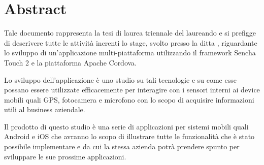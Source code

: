 \begingroup
\let\clearpage\relax
\let\cleardoublepage\relax
\let\cleardoublepage\relax

\chapter*{Abstract}
Tale documento rappresenta la tesi di laurea triennale del laureando \myName e si prefigge di descrivere tutte le attività inerenti lo stage, svolto presso la ditta \myCompany , riguardante lo sviluppo di un'applicazione multi-piattaforma utilizzando il framework Sencha Touch 2 e la piattaforma Apache Cordova.

Lo sviluppo dell'applicazione è uno studio su tali tecnologie e su come esse possano essere utilizzate efficacemente per interagire con i sensori interni ai device mobili quali GPS, fotocamera e microfono con lo scopo di acquisire informazioni utili al business aziendale.

Il prodotto di questo studio è una serie di applicazioni per sistemi mobili quali Android e iOS che avranno lo scopo di illustrare tutte le funzionalità che è stato possibile implementare e da cui la stessa azienda potrà prendere spunto per sviluppare le sue prossime applicazioni.



\endgroup

\vfill